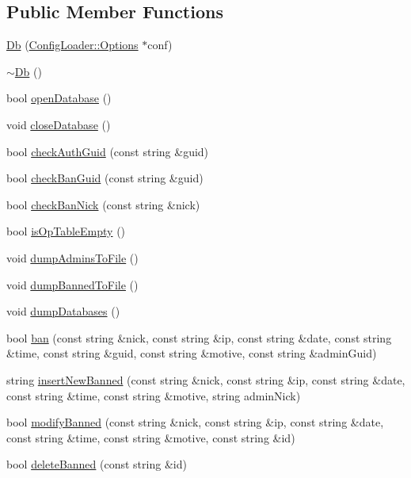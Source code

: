 \subsection*{Public Member Functions}
\begin{DoxyCompactItemize}
\item 
\hyperlink{class_db_ac4cdd4fe7ce71c90bf0c843cfd2b73f3}{Db} (\hyperlink{class_config_loader_1_1_options}{ConfigLoader::Options} $\ast$conf)
\item 
\hyperlink{class_db_a5dfbecdbc8b03a8395e066da8fe698d9}{$\sim$Db} ()
\item 
bool \hyperlink{class_db_a4df86459c7833e80a465c8fd9be9ea2c}{openDatabase} ()
\item 
void \hyperlink{class_db_a6bc14e1fe8d3650e3233e2628001e1f8}{closeDatabase} ()
\item 
bool \hyperlink{class_db_a4e1a8b5e74c238ac03ffa480a9d655f3}{checkAuthGuid} (const string \&guid)
\item 
bool \hyperlink{class_db_a8ba1c4556529873ac6def96304c41b7e}{checkBanGuid} (const string \&guid)
\item 
bool \hyperlink{class_db_a5e9ad97ead2e5e1e7b3c15b2ae020c76}{checkBanNick} (const string \&nick)
\item 
bool \hyperlink{class_db_a09e8b754785aa21b7eb6c58e908d6c59}{isOpTableEmpty} ()
\item 
void \hyperlink{class_db_af1d9c52deb07fb3c2a12be9cc5b85b83}{dumpAdminsToFile} ()
\item 
void \hyperlink{class_db_a210fa119977d3f26a4d87275abd76fb8}{dumpBannedToFile} ()
\item 
void \hyperlink{class_db_a8ad5e835ec9728a2103f04434799498c}{dumpDatabases} ()
\item 
bool \hyperlink{class_db_afc3dec33c43032e2002f26b7a0396921}{ban} (const string \&nick, const string \&ip, const string \&date, const string \&time, const string \&guid, const string \&motive, const string \&adminGuid)
\item 
string \hyperlink{class_db_ab743ec70a2e618e29f68efae1ca1690f}{insertNewBanned} (const string \&nick, const string \&ip, const string \&date, const string \&time, const string \&motive, string adminNick)
\item 
bool \hyperlink{class_db_a5ca223e005e7f215e8a554450cc4114a}{modifyBanned} (const string \&nick, const string \&ip, const string \&date, const string \&time, const string \&motive, const string \&id)
\item 
bool \hyperlink{class_db_a8a93b166b2a900c1ee9e7273464e8217}{deleteBanned} (const string \&id)

\end{DoxyCompactItemize}
